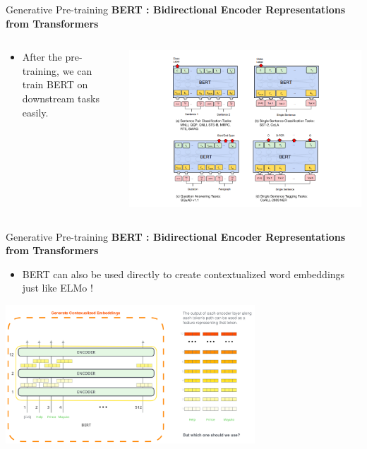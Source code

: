 \documentclass[aspectratio=169]{beamer}
\begin{document}
\begin{frame}{Generative Pre-training}
\centering
\textbf{BERT : Bidirectional Encoder Representations from Transformers \cite{devlin2018bert}}

\begin{columns}
\begin{column}{0.3\textwidth}
\begin{itemize}
	\item After the pre-training, we can train BERT on downstream tasks easily.
\end{itemize}
   
\end{column}
\begin{column}{0.7\textwidth}  %
    \centering

\includegraphics[width=\textwidth]{figures/bert-tasks}

\end{column}
\end{columns}

\end{frame}

\begin{frame}{Generative Pre-training}
\centering
\textbf{BERT : Bidirectional Encoder Representations from Transformers \cite{devlin2018bert}} 

\begin{itemize}
	\item BERT can also be used directly to create contextualized word embeddings just like ELMo !
\end{itemize}

\includegraphics[width=0.7\textwidth]{figures/bert-contextualized-embeddings}
\end{frame}
\end{document}

